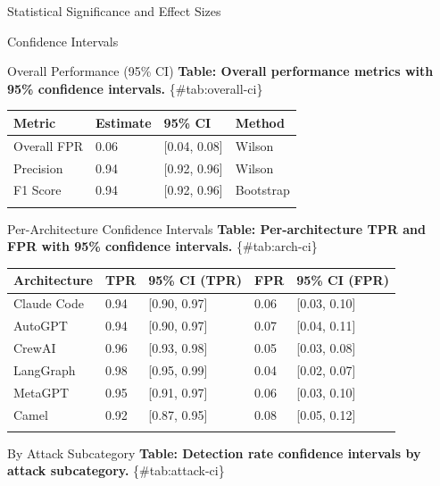 \documentclass[
  ignorenonframetext,
]{beamer}
\newcounter{none} %
\begin{document}
\begin{frame}[fragile]{Statistical Significance and Effect Sizes}
\begin{block}{Confidence Intervals}
\protect{}\label{sec:confidence-intervals}
\begin{block}{Overall Performance (95\% CI)}
\protect{}\label{sec:detection-ci}
\textbf{Table: Overall performance metrics with 95\% confidence
intervals.} \{\#tab:overall-ci\}

{\def\LTcaptype{none} %
\begin{longtable}[]{@{}llll@{}}
\toprule\noalign{}
Metric & Estimate & 95\% CI & Method \\
\midrule\noalign{}
\endhead
Overall FPR & 0.06 & {[}0.04, 0.08{]} & Wilson \\
Precision & 0.94 & {[}0.92, 0.96{]} & Wilson \\
F1 Score & 0.94 & {[}0.92, 0.96{]} & Bootstrap \\
\bottomrule\noalign{}
\end{longtable}
}
\end{block}

\begin{block}{Per-Architecture Confidence Intervals}
\protect{}\label{sec:arch-ci}
\textbf{Table: Per-architecture TPR and FPR with 95\% confidence
intervals.} \{\#tab:arch-ci\}

{\def\LTcaptype{none} %
\begin{longtable}[]{@{}lllll@{}}
\toprule\noalign{}
Architecture & TPR & 95\% CI (TPR) & FPR & 95\% CI (FPR) \\
\midrule\noalign{}
\endhead
Claude Code & 0.94 & {[}0.90, 0.97{]} & 0.06 & {[}0.03, 0.10{]} \\
AutoGPT & 0.94 & {[}0.90, 0.97{]} & 0.07 & {[}0.04, 0.11{]} \\
CrewAI & 0.96 & {[}0.93, 0.98{]} & 0.05 & {[}0.03, 0.08{]} \\
LangGraph & 0.98 & {[}0.95, 0.99{]} & 0.04 & {[}0.02, 0.07{]} \\
MetaGPT & 0.95 & {[}0.91, 0.97{]} & 0.06 & {[}0.03, 0.10{]} \\
Camel & 0.92 & {[}0.87, 0.95{]} & 0.08 & {[}0.05, 0.12{]} \\
\bottomrule\noalign{}
\end{longtable}
}
\end{block}

\begin{block}{By Attack Subcategory}
\protect{}\label{sec:attack-ci}
\textbf{Table: Detection rate confidence intervals by attack
subcategory.} \{\#tab:attack-ci\}


\end{block}
\end{block}
\end{frame}
\end{document}
